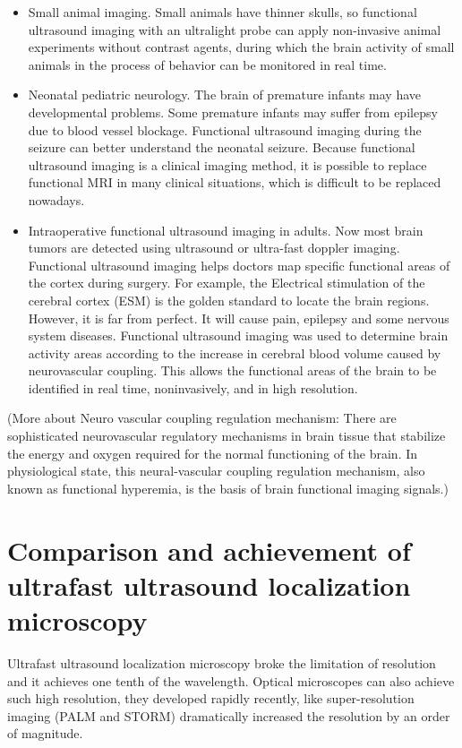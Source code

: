 \documentclass[paper=a4, fontsize=11pt]{scrartcl} %
\numberwithin{equation}{section} %
\numberwithin{figure}{section} %
\numberwithin{table}{section} %
\begin{document}
\begin{itemize}
	\item Small animal imaging. Small animals have thinner skulls, so functional ultrasound imaging with an ultralight probe can apply non-invasive animal experiments without contrast agents, during which the brain activity of small animals in the process of behavior can be monitored in real time. 
	\item Neonatal pediatric neurology. The brain of premature infants may have developmental problems. Some premature infants may suffer from epilepsy due to blood vessel blockage. Functional ultrasound imaging during the seizure can better understand the neonatal seizure. Because functional ultrasound imaging is a clinical imaging method, it is possible to replace functional MRI in many clinical situations, which is difficult to be replaced nowadays.
	\item Intraoperative functional ultrasound imaging in adults. Now most brain tumors are detected using ultrasound or ultra-fast doppler imaging. Functional ultrasound imaging helps doctors map specific functional areas of the cortex during surgery. For example, the Electrical stimulation of the cerebral cortex (ESM) is the golden standard to locate the brain regions. However, it is far from perfect. It will cause pain, epilepsy and some nervous system diseases. Functional ultrasound imaging was used to determine brain activity areas according to the increase in cerebral blood volume caused by neurovascular coupling. This allows the functional areas of the brain to be identified in real time, noninvasively, and in high resolution.
\end{itemize}
(More about Neuro vascular coupling regulation mechanism: There are sophisticated neurovascular regulatory mechanisms in brain tissue that stabilize the energy and oxygen required for the normal functioning of the brain. In physiological state, this neural-vascular coupling regulation mechanism, also known as functional hyperemia, is the basis of brain functional imaging signals.)

\section{Comparison and achievement of ultrafast ultrasound localization microscopy}
Ultrafast ultrasound localization microscopy broke the limitation of resolution and it achieves one tenth of the wavelength. Optical microscopes can also achieve such high resolution, they developed rapidly recently, like super-resolution imaging (PALM and STORM) dramatically increased the resolution by an order of magnitude. 
\end{document}
